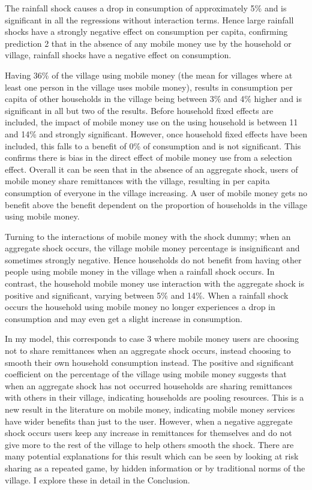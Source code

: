 The rainfall shock causes a drop in consumption of approximately 5\% and is  significant in all the regressions without interaction terms. Hence large rainfall shocks have a strongly negative effect on consumption per capita, confirming prediction 2 that in the absence of any mobile money use by the household or village, rainfall shocks have a negative effect on consumption.  

Having 36\% of the village using mobile money (the mean for villages where at least one person in the village uses mobile money), results in consumption per capita of other households in the village being between 3\% and 4\% higher and is  significant in all but two of the results. Before household fixed effects are included, the impact of mobile money use on the using household is between 11 and 14\% and strongly significant. However, once household fixed effects have been included, this falls to a benefit of 0\% of consumption and is not significant. This confirms there is bias in the direct effect of mobile money use from a selection effect. Overall it can be seen that in the absence of an aggregate shock, users of mobile money share remittances with the village, resulting in per capita consumption of everyone in the village increasing. A user of mobile money gets no benefit above the benefit dependent on the proportion of households in the village using mobile money. 

Turning to the interactions of mobile money with the shock dummy; when an aggregate shock occurs, the village mobile money percentage is insignificant and sometimes strongly negative. Hence households do not benefit from having other people using mobile money in the village when a rainfall shock occurs. In contrast, the household mobile money use interaction with the aggregate shock is positive and significant, varying between 5\% and 14\%. When a rainfall shock occurs the household using mobile money no longer experiences a drop in consumption and may even get a slight increase in consumption.  

In my model, this corresponds to case 3 where mobile money users are choosing not to share remittances when an aggregate shock occurs, instead choosing to smooth their own household consumption instead. The positive and significant coefficient on the percentage of the village using mobile money suggests that when an aggregate shock has not occurred households are sharing remittances with others in their village, indicating households are pooling resources. This is a new result in the literature on mobile money, indicating mobile money services have wider benefits than just to the user. However, when a negative aggregate shock occurs users keep any increase in remittances for themselves and do not give more to the rest of the village to help others smooth the shock. There are many potential explanations for this result which can be seen by looking at risk sharing as a repeated game, by hidden information or by traditional norms of the village. I explore these in detail in the Conclusion.   

